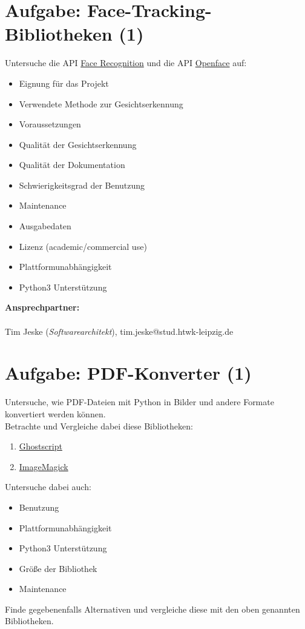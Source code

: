 \documentclass{article}
\begin{document}
\section{Aufgabe: Face-Tracking-Bibliotheken (1)}
Untersuche die API \href{https://github.com/ageitgey/face\_recognition}{Face Recognition} und die API \href{https://github.com/cmusatyalab/openface}{Openface} auf:
\begin{itemize}
    \item Eignung für das Projekt
    \item Verwendete Methode zur Gesichtserkennung
    \item Voraussetzungen
    \item Qualität der Gesichtserkennung
    \item Qualität der Dokumentation
    \item Schwierigkeitsgrad der Benutzung
    \item Maintenance
    \item Ausgabedaten
    \item Lizenz (academic/commercial use)
    \item Plattformunabhängigkeit
    \item Python3 Unterstützung
\end{itemize}
\textbf{Ansprechpartner:}
\\\\
Tim Jeske (\emph{Softwarearchitekt}), tim.jeske@stud.htwk-leipzig.de

\newpage

\section{Aufgabe: PDF-Konverter (1)}
Untersuche, wie PDF-Dateien mit Python in Bilder und andere Formate konvertiert werden können.\\
Betrachte und Vergleiche dabei diese Bibliotheken:
\begin{enumerate}
    \item \href{https://gitlab.com/pdftools/python-ghostscript}{Ghostscript}
    \item \href{http://www.imagemagick.org/script/index.php}{ImageMagick}
\end{enumerate}
Untersuche dabei auch:
\begin{itemize}
    \item Benutzung
    \item Plattformunabhängigkeit
    \item Python3 Unterstützung
    \item Größe der Bibliothek
    \item Maintenance
\end{itemize}
Finde gegebenenfalls Alternativen und vergleiche diese mit den oben genannten Bibliotheken.
\end{document}
